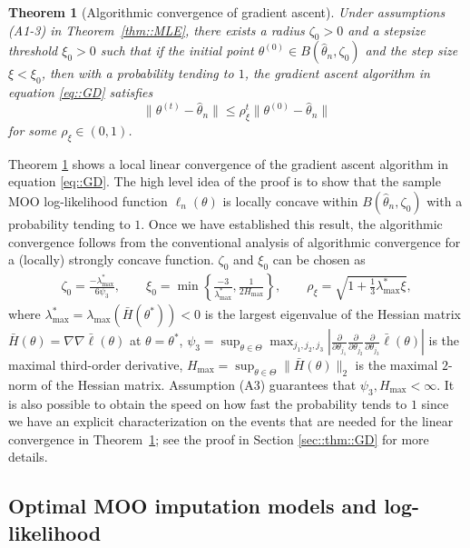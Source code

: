 \documentclass[aos, preprint]{imsart}
\theoremstyle{plain}
\newtheorem{theorem}{Theorem}[section]
\theoremstyle{definition}
\let\hat\widehat
\begin{document}
\begin{theorem}[Algorithmic convergence of gradient ascent]
Under assumptions (A1-3) in Theorem~\ref{thm::MLE}, there exists
a radius $\zeta_0>0$ and a stepsize threshold $\xi_0>0$ such that 
if the initial point  $\theta^{(0)}\in B(\hat \theta_n, \zeta_0)$
and the step size $\xi< \xi_0$,
then with a probability tending to $1$, the gradient ascent algorithm in equation \eqref{eq::GD} satisfies
$$
\|\theta^{(t)} - \hat \theta_n\| \leq \rho_\xi^t \|\theta^{(0)} - \hat \theta_n\|
$$
for some $\rho_\xi \in(0,1)$.
\label{thm::GD}
\end{theorem}
Theorem \ref{thm::GD} shows a local linear convergence \citep{boyd2004convex} of the gradient ascent algorithm in equation \eqref{eq::GD}.
The high level idea of the proof is to show that the sample MOO log-likelihood function $\ell_n(\theta)$
is locally concave within $B(\hat \theta_n, \zeta_0)$ with a probability tending to $1$.
Once we have established this result, the algorithmic convergence follows
from the conventional analysis of algorithmic convergence for a (locally) strongly concave function.
$\zeta_0$ and $\xi_0$ can be chosen as
\begin{align*}
\zeta_0 = \frac{-\lambda^*_{\max}}{6\psi_3},\qquad
 \xi_0 =\min\left\{\frac{-3}{\lambda^*_{\max}}, \frac{1}{2H_{\max}}\right\},\qquad \rho_\xi =\sqrt{1+\frac{1}{3}\lambda^*_{\max}\xi},
\end{align*}
where 
$ \lambda^*_{\max} = \lambda_{\max}( \bar H(\theta^*))<0$
is the largest eigenvalue of the Hessian matrix
$\bar H(\theta)  = \nabla\nabla \bar \ell(\theta)$ at $\theta =\theta^*$,
$ \psi_3  =  \sup_{\theta\in\Theta} \max_{j_1,j_2,j_3}\left|\frac{\partial}{\partial \theta_{j_1}}\frac{\partial}{\partial \theta_{j_2}}\frac{\partial}{\partial \theta_{j_3}}\bar \ell(\theta)\right|$
is the maximal third-order derivative,
$ H_{\max} = \sup_{\theta\in\Theta} \|\bar H(\theta)\|_2$ is the maximal $2$-norm of the Hessian matrix.
Assumption (A3) guarantees that $\psi_3, H_{\max}<\infty$.
It is also possible to obtain the speed on how fast the probability tends to $1$
since we have an explicit characterization on the events that are needed for the linear convergence in Theorem~\ref{thm::GD};
see the proof in Section \ref{sec::thm::GD} for more details.



\subsection{Optimal MOO imputation models and log-likelihood}
\end{document}
